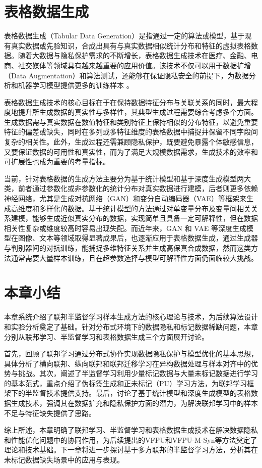 \section{表格数据生成}


表格数据生成（Tabular Data Generation）是指通过一定的算法或模型，基于现有真实数据或先验知识，合成出具有与真实数据相似统计分布和特征的虚拟表格数据。随着大数据与隐私保护需求的不断增长，表格数据生成技术在医疗、金融、电商、社交媒体等领域具有越来越重要的应用价值。该技术不仅可以用于数据扩增（Data Augmentation）和算法测试，还能够在保证隐私安全的前提下，为数据分析和机器学习模型提供更多的训练样本 \citep{li2021survey}。

表格数据生成技术的核心目标在于在保持数据特征分布与关联关系的同时，最大程度地提升所生成数据的真实性与多样性，其典型生成过程需要综合考虑多个方面。生成数据需与真实数据在数值特征和类别特征上保持相似的分布特征，以避免重要特征的偏差或缺失，同时在多列或多特征维度的表格数据中捕捉并保留不同字段间复杂的相关性\citep{zhang2020tab}。此外，生成过程还需兼顾隐私保护，既要避免暴露个体敏感信息，又要保证数据的可用性和真实性，而为了满足大规模数据需求，生成技术的效率和可扩展性也成为重要的考量指标。


当前，针对表格数据的生成方法主要分为基于统计模型和基于深度生成模型两大类，前者通过参数化或非参数化的统计分布对真实数据进行建模，后者则更多依赖神经网络，尤其是生成对抗网络（GAN）和变分自动编码器（VAE）等框架来生成高维度和多样化的数据\citep{brown2019differential}。基于统计模型的方法通过对单变量分布及变量间相关关系建模，能够生成近似真实分布的数据，实现简单且具备一定可解释性，但在数据相关性复杂或维度较高时容易出现失配。而近年来，GAN 和 VAE 等深度生成模型在图像、文本等领域取得显著成果后，也逐渐应用于表格数据生成，通过生成器与判别器间的对抗训练，能捕捉多维特征关系并生成高保真合成数据，然而这类方法通常需要大量样本训练，且在超参数选择与模型可解释性方面仍面临较大挑战。




\section{本章小结}
本章系统介绍了联邦半监督学习样本生成方法的核心理论与技术，为后续算法设计和实验分析奠定了基础。针对分布式环境下的数据隐私和标记数据稀缺问题，本章分别从联邦学习、半监督学习和表格数据生成三个方面展开讨论。

首先，回顾了联邦学习通过分布式协作实现数据隐私保护与模型优化的基本思想，具体分析了横向联邦、纵向联邦和联邦迁移学习在异构数据处理与样本对齐中的优势与挑战。其次，阐述了半监督学习利用少量标记数据与大量未标记数据进行学习的基本范式，重点介绍了伪标签生成和正未标记（PU）学习方法，为联邦学习框架下的半监督技术提供支持。最后，讨论了基于统计模型和深度生成模型的表格数据生成技术，强调其在数据扩充和隐私保护方面的潜力，为解决联邦学习中的样本不足与特征缺失提供了思路。

综上所述，本章明确了联邦学习、半监督学习和表格数据生成技术在解决数据隐私和性能优化问题中的协同作用，为后续提出的VFPU和VFPU-M-Syn等方法奠定了理论和技术基础。下一章将进一步探讨基于多方联邦的半监督学习方法，分析其在未标记数据缺失场景中的应用与表现。